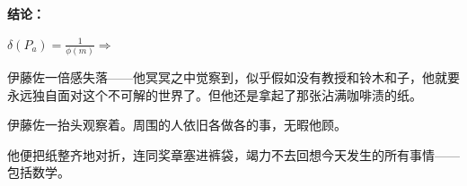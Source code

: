 \noindent\textbf{结论：}



  \(
  \delta(P_a) = \frac{1}{\phi(m)}\Rightarrow
  \)
\clearpage
\pagecolor{cyan!10!gray}
\color{white}

伊藤佐一倍感失落——他冥冥之中觉察到，似乎假如没有教授和铃木和子，他就要永远独自面对这个不可解的世界了。但他还是拿起了那张沾满咖啡渍的纸。


伊藤佐一抬头观察着。周围的人依旧各做各的事，无暇他顾。

他便把纸整齐地对折，连同奖章塞进裤袋，竭力不去回想今天发生的所有事情——包括数学。


